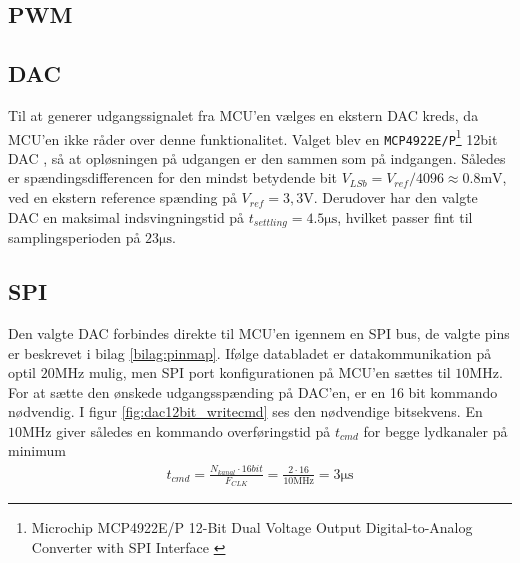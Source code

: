 

\subsection{PWM}

\subsection{DAC}
Til at generer udgangssignalet fra MCU'en vælges en ekstern DAC kreds, da MCU'en ikke råder over denne funktionalitet.
Valget blev en \texttt{MCP4922E/P}\footnote{Microchip MCP4922E/P 12-Bit Dual Voltage Output Digital-to-Analog Converter with SPI Interface \cite{mcp4922} } 12bit DAC , så at opløsningen på udgangen er den sammen som på indgangen.
Således er spændingsdifferencen for den mindst betydende bit $ V_{LSb} = V_{ref} / 4096 \approx \num{0,8}\si{\milli\volt} $, ved en ekstern reference spænding på $V_{ref} = 3,3\si{\volt}$.
Derudover har den valgte DAC en maksimal indsvingningstid på $t_{settling} = \num{4.5}\si{\micro\second}$, hvilket passer fint til samplingsperioden på $23\si{\micro\second}$. 

\subsection{SPI}
Den valgte DAC forbindes direkte til MCU'en igennem en SPI bus, de valgte pins er beskrevet i bilag \ref{bilag:pinmap}.
Ifølge databladet er datakommunikation på optil $20\si{\mega\hertz}$ mulig, men SPI port konfigurationen på MCU'en sættes til $10\si{\mega\hertz}$.
For at sætte den ønskede udgangsspænding på DAC'en, er en 16 bit kommando nødvendig. 
I figur \ref{fig:dac12bit_writecmd} ses den nødvendige bitsekvens.
En $10\si{\mega\hertz}$ giver således en kommando overføringstid på $t_{cmd}$ for begge lydkanaler på minimum 
\begin{align}
	t_{cmd} = \frac{N_{kanal} \cdot 16bit}{F_{CLK}} = \frac{2 \cdot 16}{10\si{\mega\hertz}} = 3\si{\micro\second}
\end{align}

